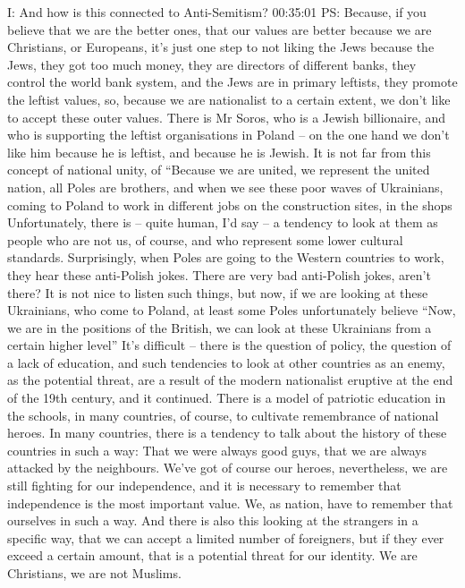 I: And how is this connected to Anti-Semitism? 00:35:01
PS: Because, if you believe that we are the better ones, that our values are better because we are Christians, or Europeans, it’s just one step to not liking the Jews because the Jews, they got too much money, they are directors of different banks, they control the world bank system, and the Jews are in primary leftists, they promote the leftist values, so, because we are nationalist to a certain extent, we don’t like to accept these outer values. There is Mr Soros, who is a Jewish billionaire, and who is supporting the leftist organisations in Poland – on the one hand we don’t like him because he is leftist, and because he is Jewish. It is not far from this concept of national unity, of “Because we are united, we represent the united nation, all Poles are brothers, and when we see these poor waves of Ukrainians, coming to Poland to work in different jobs on the construction sites, in the shops Unfortunately, there is – quite human, I’d say – a tendency to look at them as people who are not us, of course, and who represent some lower cultural standards. Surprisingly, when Poles are going to the Western countries to work, they hear these anti-Polish jokes. There are very bad anti-Polish jokes, aren’t there? It is not nice to listen such things, but now, if we are looking at these Ukrainians, who come to Poland, at least some Poles unfortunately believe “Now, we are in the positions of the British, we can look at these Ukrainians from a certain higher level” It’s difficult – there is the question of policy, the question of a lack of education, and such tendencies to look at other countries as an enemy, as the potential threat, are a result of the modern nationalist eruptive at the end of the 19th century, and it continued. There is a model of patriotic education in the schools, in many countries, of course, to cultivate remembrance of national heroes. In many countries, there is a tendency to talk about the history of these countries in such a way: That we were always good guys, that we are always attacked by the neighbours. We’ve got of course our heroes, nevertheless, we are still fighting for our independence, and it is necessary to remember that independence is the most important value. We, as nation, have to remember that ourselves in such a way. And there is also this looking at the strangers in a specific way, that we can accept a limited number of foreigners, but if they ever exceed a certain amount, that is a potential threat for our identity. We are Christians, we are not Muslims.
